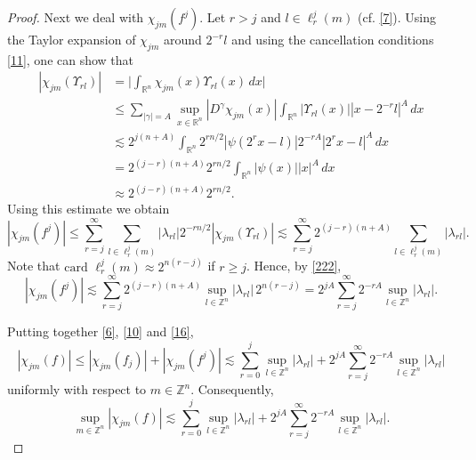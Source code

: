 \documentclass[11pt, a4paper,leqno]{amsart}
\theoremstyle{plain}
\numberwithin{equation}{section}
\theoremstyle{definition}
\theoremstyle{remark}
\begin{document}
\begin{proof}
Next we deal with $\chi_{jm}(f^{j})$. Let $r>j$ and $l\in\ell_{r}^{j}(m)$ (cf.
\eqref{7}). Using the Taylor expansion of $\chi_{jm}$ around $2^{-r}l$ and
using the cancellation conditions \eqref{11}, one can show that
\begin{align*}
|\chi_{jm}(\Upsilon_{rl})|  &  =\bigg|\int_{\mathbb{R}^{n}}\chi_{jm}%
(x)\Upsilon_{rl}(x)\,dx\bigg|\\
&  \leq\sum_{|\gamma|=A}\sup_{x\in\mathbb{R}^{n}}|D^{\gamma}\chi_{jm}%
(x)|\int_{\mathbb{R}^{n}}|\Upsilon_{rl}(x)||x-2^{-r}l|^{A}\,dx\\
&  \lesssim2^{j(n+A)}\int_{\mathbb{R}^{n}}2^{rn/2}|\psi(2^{r}x-l)|2^{-rA}%
|2^{r}x-l|^{A}\,dx\\
&  =2^{(j-r)(n+A)}2^{rn/2}\int_{\mathbb{R}^{n}}|\psi(x)||x|^{A}\,dx\\
&  \approx2^{(j-r)(n+A)}2^{rn/2}.
\end{align*}
Using this estimate we obtain
\begin{equation}
|\chi_{jm}(f^{j})|    \leq\sum_{r=j}^{\infty}\sum_{l\in\ell_{r}^{j}%
(m)}|\lambda_{rl}|2^{-rn/2}|\chi_{jm}(\Upsilon_{rl})|  \lesssim\sum_{r=j}^{\infty}2^{(j-r)(n+A)}\sum_{l\in\ell_{r}^{j}(m)}%
|\lambda_{rl}|. \label{222}%
\end{equation}
Note that $\text{card }\ell_{r}^{j}(m)\approx2^{n(r-j)}$ if $r\geq j$. Hence,
by \eqref{222},
\begin{equation}
|\chi_{jm}(f^{j})|    \lesssim\sum_{r=j}^{\infty}2^{(j-r)(n+A)}\sup
_{l\in\mathbb{Z}^{n}}|\lambda_{rl}|\,2^{n(r-j)}  =2^{jA}\sum_{r=j}^{\infty}2^{-rA}\sup_{l\in\mathbb{Z}^{n}}|\lambda_{rl}|.
\label{16}%
\end{equation}


Putting together \eqref{6}, \eqref{10} and \eqref{16},
\begin{equation*}
|\chi_{jm}(f)|   \leq|\chi_{jm}(f_{j})|+|\chi_{jm}(f^{j})|  \lesssim\sum_{r=0}^{j}\sup_{l\in\mathbb{Z}^{n}}|\lambda_{rl}|+2^{jA}%
\sum_{r=j}^{\infty}2^{-rA}\sup_{l\in\mathbb{Z}^{n}}|\lambda_{rl}|
\end{equation*}
uniformly with respect to $m\in\mathbb{Z}^{n}$. Consequently,
\begin{equation}
\sup_{m\in\mathbb{Z}^{n}}|\chi_{jm}(f)|\lesssim\sum_{r=0}^{j}\sup
_{l\in\mathbb{Z}^{n}}|\lambda_{rl}|+2^{jA}\sum_{r=j}^{\infty}2^{-rA}\sup
_{l\in\mathbb{Z}^{n}}|\lambda_{rl}|. \label{17}%
\end{equation}



\end{proof}
\end{document}
